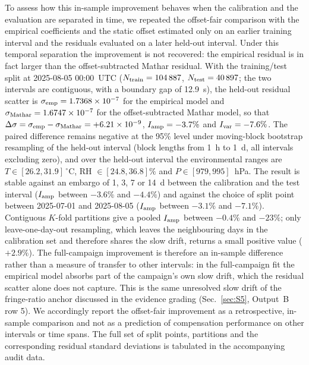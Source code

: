 \documentclass[aps,prapplied,reprint,superscriptaddress]{revtex4-2}
\begin{document}
To assess how this in-sample improvement behaves when the calibration and the evaluation are separated in time, we repeated the offset-fair comparison with the empirical coefficients and the static offset estimated only on an earlier training interval and the residuals evaluated on a later held-out interval. Under this temporal separation the improvement is not recovered: the empirical residual is in fact larger than the offset-subtracted Mathar residual. With the training/test split at 2025-08-05 00:00~UTC ($N_{\rm train} = 104\,887$, $N_{\rm test} = 40\,897$; the two intervals are contiguous, with a boundary gap of \SI{12.9}{\second}), the held-out residual scatter is $\sigma_{\rm emp} = 1.7368\times10^{-7}$ for the empirical model and $\sigma_{\rm Mathar} = 1.6747\times10^{-7}$ for the offset-subtracted Mathar model, so that $\Delta\sigma = \sigma_{\rm emp} - \sigma_{\rm Mathar} = +6.21\times10^{-9}$, $I_{\rm amp} = -3.7\%$ and $I_{\rm var} = -7.6\%$. The paired difference remains negative at the 95\% level under moving-block bootstrap resampling of the held-out interval (block lengths from \SI{1}{\hour} to \SI{1}{\day}, all intervals excluding zero), and over the held-out interval the environmental ranges are $T \in [26.2, 31.9]\,^{\circ}$C, RH $\in [24.8, 36.8]\%$ and $P \in [979, 995]$~hPa. The result is stable against an embargo of 1, 3, 7 or \SI{14}{\day} between the calibration and the test interval ($I_{\rm amp}$ between $-3.6\%$ and $-4.4\%$) and against the choice of split point between 2025-07-01 and 2025-08-05 ($I_{\rm amp}$ between $-3.1\%$ and $-7.1\%$). Contiguous $K$-fold partitions give a pooled $I_{\rm amp}$ between $-0.4\%$ and $-23\%$; only leave-one-day-out resampling, which leaves the neighbouring days in the calibration set and therefore shares the slow drift, returns a small positive value ($+2.9\%$). The full-campaign improvement is therefore an in-sample difference rather than a measure of transfer to other intervals: in the full-campaign fit the empirical model absorbs part of the campaign's own slow drift, which the residual scatter alone does not capture. This is the same unresolved slow drift of the fringe-ratio anchor discussed in the evidence grading (Sec.~\ref{sec:S5}, Output~B row 5). We accordingly report the offset-fair improvement as a retrospective, in-sample comparison and not as a prediction of compensation performance on other intervals or time spans. The full set of split points, partitions and the corresponding residual standard deviations is tabulated in the accompanying audit data.
\end{document}
